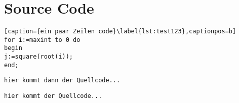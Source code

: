 

\section{Source Code}
\label{sec:Source Code}


%



\begin{lstlisting}[caption={ein paar Zeilen code}\label{lst:test123},captionpos=b] 
for i:=maxint to 0 do 
begin 
j:=square(root(i)); 
end; 
\end{lstlisting}


\begin{verbatim}
hier kommt dann der Quellcode...
\end{verbatim}

\lstinline[]
{hier kommt der Quellcode...}






